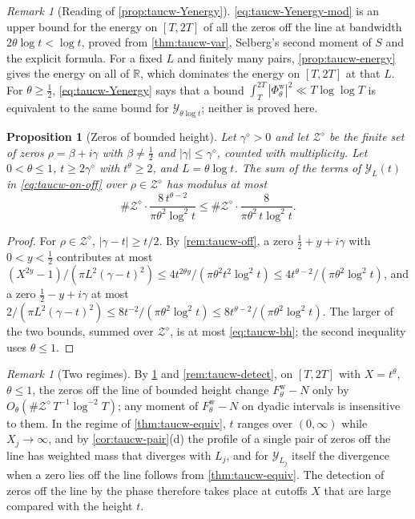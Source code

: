 \documentclass[11pt,a4paper]{article}
\numberwithin{equation}{section}
\newtheorem{proposition}[theorem]{Proposition}
\theoremstyle{definition}
\theoremstyle{remark}
\newtheorem{remark}[theorem]{Remark}
\begin{document}
\begin{remark}[Reading of \cref{prop:taucw-Yenergy}]\label{rem:taucw-Yenergy}
\eqref{eq:taucw-Yenergy-mod} is an upper bound for the energy on $[T,2T]$ of all the zeros off the line at bandwidth $2\theta\log t<\log t$, proved from \cref{thm:taucw-var}, Selberg's second moment of $S$ and the explicit formula. For a fixed $L$ and finitely many pairs, \cref{prop:taucw-energy} gives the energy on all of $\mathbb R$, which dominates the energy on $[T,2T]$ at that $L$. For $\theta\ge\frac12$, \eqref{eq:taucw-Yenergy} says that a bound $\int_T^{2T}|\Phi^{\mathrm w}_\theta|^2\ll T\log\log T$ is equivalent to the same bound for $\mathcal Y_{\theta\log t}$; neither is proved here.
\end{remark}

\begin{proposition}[Zeros of bounded height]\label{prop:taucw-bh}
Let $\gamma^\diamond>0$ and let $\mathscr Z^\diamond$ be the finite set of zeros $\rho=\beta+i\gamma$ with $\beta\ne\frac12$ and $|\gamma|\le\gamma^\diamond$, counted with multiplicity. Let $0<\theta\le1$, $t\ge2\gamma^\diamond$ with $t^\theta\ge2$, and $L=\theta\log t$. The sum of the terms of $\mathcal Y_L(t)$ in \eqref{eq:taucw-on-off} over $\rho\in\mathscr Z^\diamond$ has modulus at most
\begin{equation}\label{eq:taucw-bh}
\#\mathscr Z^\diamond\cdot\frac{8\,t^{\theta-2}}{\pi\theta^2\log^2t}\le\#\mathscr Z^\diamond\cdot\frac{8}{\pi\theta^2\,t\log^2t}.
\end{equation}
\end{proposition}
\begin{proof}
For $\rho\in\mathscr Z^\diamond$, $|\gamma-t|\ge t/2$. By \cref{rem:taucw-off}, a zero $\frac12+y+i\gamma$ with $0<y<\frac12$ contributes at most $(X^{2y}-1)/(\pi L^2(\gamma-t)^2)\le4t^{2\theta y}/(\pi\theta^2t^2\log^2t)\le4t^{\theta-2}/(\pi\theta^2\log^2t)$, and a zero $\frac12-y+i\gamma$ at most $2/(\pi L^2(\gamma-t)^2)\le8t^{-2}/(\pi\theta^2\log^2t)\le8t^{\theta-2}/(\pi\theta^2\log^2t)$. The larger of the two bounds, summed over $\mathscr Z^\diamond$, is at most \eqref{eq:taucw-bh}; the second inequality uses $\theta\le1$.
\end{proof}
\begin{remark}[Two regimes]\label{rem:taucw-bh}
By \cref{prop:taucw-bh} and \cref{rem:taucw-detect}, on $[T,2T]$ with $X=t^\theta$, $\theta\le1$, the zeros off the line of bounded height change $F^{\mathrm w}_\theta-N$ only by $O_{\theta}(\#\mathscr Z^\diamond\,T^{-1}\log^{-2}T)$; any moment of $F^{\mathrm w}_\theta-N$ on dyadic intervals is insensitive to them. In the regime of \cref{thm:taucw-equiv}, $t$ ranges over $(0,\infty)$ while $X_j\to\infty$, and by \cref{cor:taucw-pair}(d) the profile of a single pair of zeros off the line has weighted mass that diverges with $L_j$, and for $\mathcal Y_{L_j}$ itself the divergence when a zero lies off the line follows from \cref{thm:taucw-equiv}. The detection of zeros off the line by the phase therefore takes place at cutoffs $X$ that are large compared with the height $t$.
\end{remark}
\end{document}
